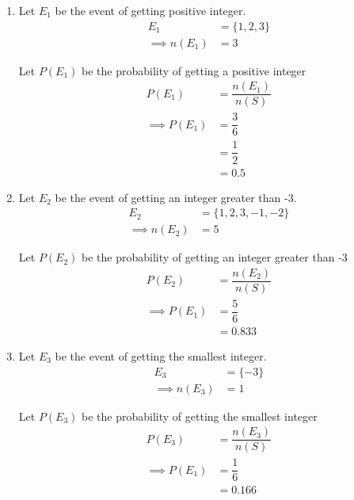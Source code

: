 \documentclass[journal,12pt,twocolumn]{IEEEtran}
\begin{document}
\begin{enumerate}[label=(\roman*)]
    \item

Let $E_1$ be the event of getting positive integer.\\
\begin{align}
E_1 &= \{1,2,3\}\\
\implies  n (E_1) &= 3
\end{align}

Let $P(E_1)$ be the probability of getting a positive integer\\
\begin{align}
    P(E_1) &=\dfrac{n(E_1)}{n(S)}\\
   \implies P(E_1)&=\dfrac{3}{6}\\
             &=\dfrac{1}{2}\\
             &=0.5
 \end{align}
 
\item
Let $E_2$ be the event of getting an integer greater than -3.\\
\begin{align}
E_2 &= \{1,2,3,-1,-2\}\\
\implies  n (E_2) &= 5
\end{align}

Let $P(E_2)$ be the probability of getting an integer greater than -3\\
\begin{align}
    P(E_2)&=\dfrac{n(E_2)}{n(S)}\\
   \implies P(E_1)&=\dfrac{5}{6}\\
                  &=0.833
 \end{align} 
 
\item
Let $E_3$ be the event of getting the smallest integer.\\
\begin{align}
E_3&=\{-3\}\\
\implies n(E_3)&=1
\end{align}

Let $P(E_3)$ be the probability of getting the smallest integer
\begin{align}
        P(E_3) &=\dfrac{n(E_3)}{n(S)}\\
        \implies P(E_1)&=\dfrac{1}{6}\\
                       &=0.166
\end{align}
\end{enumerate}
\end{document}

